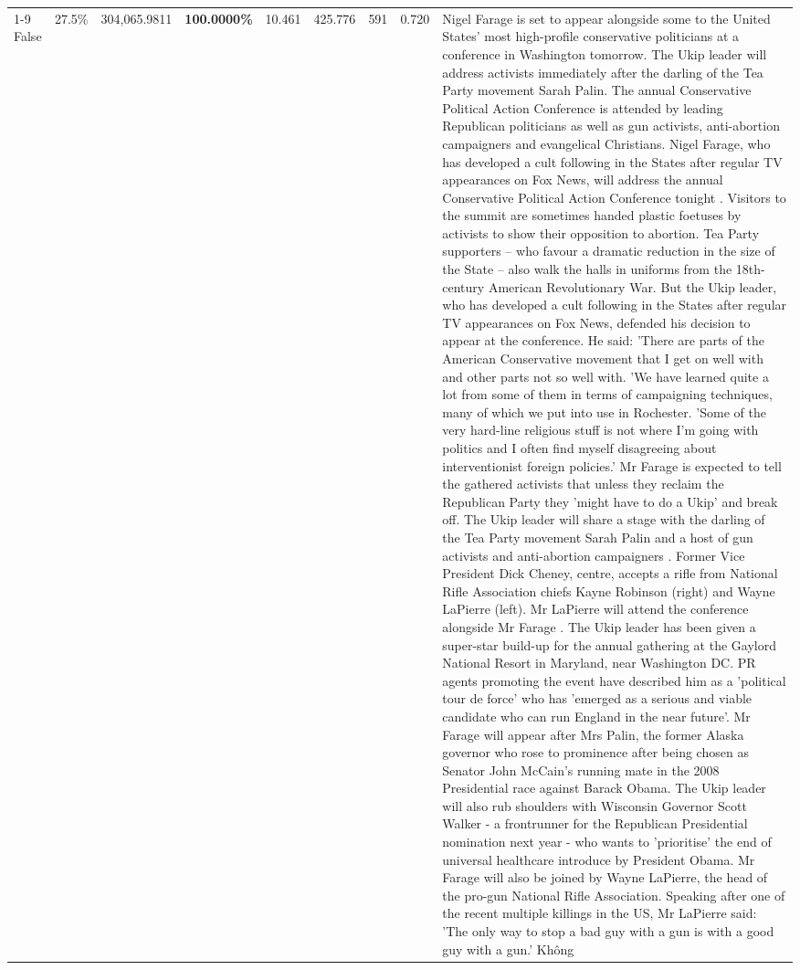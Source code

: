 \begin{table}[H]
\begin{tabular}{lllrlllll}
\cline{1-9}
False & 27.5\% & 304,065.9811 & \bfseries \color{red} 100.0000\% & 10.461 & 425.776 & 591 & 0.720 & Nigel Farage is set to appear alongside some to the United States' most high-profile conservative politicians at a conference in Washington tomorrow. The Ukip leader will address activists immediately after the darling of the Tea Party movement Sarah Palin. The annual Conservative Political Action Conference is attended by leading Republican politicians as well as gun activists, anti-abortion campaigners and evangelical Christians. Nigel Farage, who has developed a cult following in the States after regular TV appearances on Fox News, will address the annual Conservative Political Action Conference tonight . Visitors to the summit are sometimes handed plastic foetuses by activists to show their opposition to abortion. Tea Party supporters – who favour a dramatic reduction in the size of the State – also walk the halls in uniforms from the 18th-century American Revolutionary War. But the Ukip leader, who has developed a cult following in the States after regular TV appearances on Fox News, defended his decision to appear at the conference. He said: 'There are parts of the American Conservative movement that I get on well with and other parts not so well with. 'We have learned quite a lot from some of them in terms of campaigning techniques, many of which we put into use in Rochester. 'Some of the very hard-line religious stuff is not where I'm going with politics and I often find myself disagreeing about interventionist foreign policies.' Mr Farage is expected to tell the gathered activists that unless they reclaim the Republican Party they 'might have to do a Ukip' and break off. The Ukip leader will share a stage with the darling of the Tea Party movement Sarah Palin and a host of gun activists and anti-abortion campaigners . Former Vice President Dick Cheney, centre, accepts a rifle from National Rifle Association chiefs Kayne Robinson (right) and Wayne LaPierre (left). Mr LaPierre will attend the conference alongside Mr Farage . The Ukip leader has been given a super-star build-up for the annual gathering at the Gaylord National Resort in Maryland, near Washington DC. PR agents promoting the event have described him as a 'political tour de force' who has 'emerged as a serious and viable candidate who can run England in the near future'. Mr Farage will appear after Mrs Palin, the former Alaska governor who rose to prominence after being chosen as Senator John McCain's running mate in the 2008 Presidential race against Barack Obama. The Ukip leader will also rub shoulders with Wisconsin Governor Scott Walker - a frontrunner for the Republican Presidential nomination next year - who wants to 'prioritise' the end of universal healthcare introduce by President Obama. Mr Farage will also be joined by Wayne LaPierre, the head of the pro-gun National Rifle Association. Speaking after one of the recent multiple killings in the US, Mr LaPierre said: 'The only way to stop a bad guy with a gun is with a good guy with a gun.' Không \\

\end{tabular}
\end{table}
